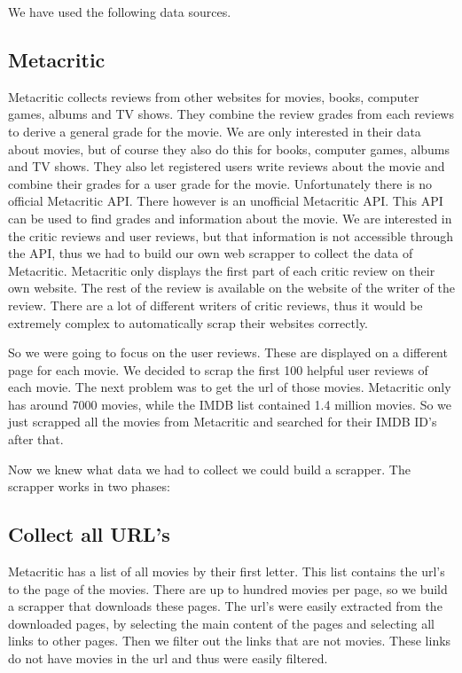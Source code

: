 We have used the following data sources.

\subsection{Metacritic}
\label{sec:data:metacritic}
Metacritic collects reviews from other websites for movies, books, computer games, albums and TV shows. 
They combine the review grades from each reviews to derive a general grade for the movie.
We are only interested in their data about movies, but of course they also do this for books, computer games, albums and TV shows.
They also let registered users write reviews about the movie and combine their grades for a user grade for the movie. 
Unfortunately there is no official Metacritic API. There however is an unofficial Metacritic API. 
This API can be used to find grades and information about the movie.
We are interested in the critic reviews and user reviews, but that information is not accessible through the API, thus we had to build our own web scrapper to collect the data of Metacritic. 
Metacritic only displays the first part of each critic review on their own website. 
The rest of the review is available on the website of the writer of the review. 
There are a lot of different writers of critic reviews, thus it would be extremely complex to automatically scrap their websites correctly. 

So we were going to focus on the user reviews. These are displayed on a different page for each movie. 
We decided to scrap the first 100 helpful user reviews of each movie. 
The next problem was to get the url of those movies. 
Metacritic only has around 7000 movies, while the IMDB list contained 1.4 million movies. 
So we just scrapped all the movies from Metacritic and searched for their IMDB ID’s after that. 

Now we knew what data we had to collect we could build a scrapper.
The scrapper works in two phases:
\subsection{Collect all URL’s }
Metacritic has a list of all movies by their first letter. This list contains the url’s to the page of the movies. 
There are up to hundred movies per page, so we build a scrapper that downloads these pages. 
The url’s were easily extracted from the downloaded pages, by selecting the main content of the pages and selecting all links to other pages. 
Then we filter out the links that are not movies. These links do not have movies in the url and thus were easily filtered. 
